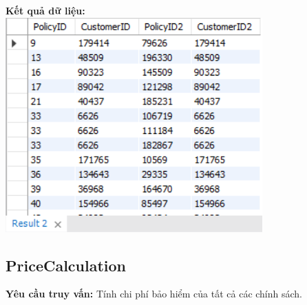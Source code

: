 \documentclass[12pt,a4paper]{report}
\begin{document}
	{\bf Kết quả dữ liệu:}
	\\
	\includegraphics[width=\linewidth]{MultiPolicyBenefits}
	
\subsection{PriceCalculation}
	{\bf Yêu cầu truy vấn:} Tính chi phí bảo hiểm của tất cả các chính sách.
	
\end{document}
